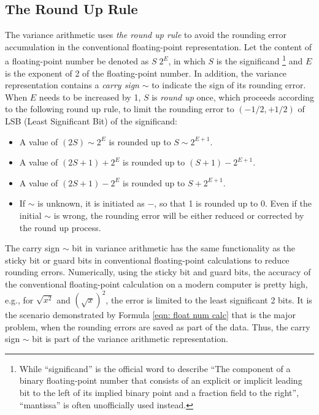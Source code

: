 \documentclass[twoside]{article}
\numberwithin{equation}{section}
\begin{document}
\subsection{The Round Up Rule \cite{Prev_Precision_Arithmetic}}

The variance arithmetic uses \emph{the round up rule} to avoid the rounding error accumulation in the conventional floating-point representation.
Let the content of a floating-point number be denoted as $S\; 2^E$, in which $S$ is the significand \footnote{While ``significand'' is the official word \cite{Floating_Point_Standard} to describe ``The component of a binary floating-point number that consists of an explicit or implicit leading bit to the left of its implied binary point and a fraction field to the right'', ``mantissa'' is often unofficially used instead.} and $E$ is the exponent of 2 of the floating-point number.  
In addition, the variance representation contains a \emph{carry sign} $\sim$  to indicate the sign of its rounding error.
When $E$ needs to be increased by 1, $S$ is \emph{round up} once, which proceeds according to the following round up rule, to limit the rounding error to $(-1/2, +1/2)$ of LSB (Least Significant Bit) of the significand:
\begin{itemize}
\item A value of $(2S) \sim 2^E$ is rounded up to $S \sim 2^{E+1}$.  

\item A value of $(2S+1)\!+\!2^E$ is rounded up to $(S+1)\!-\!2^{E+1}$.
  
\item A value of $(2S+1)\!-\!2^E$ is rounded up to $S\!+\!2^{E+1}$.

\item If $\sim$ is unknown, it is initiated as $-$, so that 1 is rounded up to 0.
Even if the initial $\sim$ is wrong, the rounding error will be either reduced or corrected by the round up process.
\end{itemize}

The carry sign $\sim$ bit in variance arithmetic has the same functionality as the sticky bit or guard bits in conventional floating-point calculations \cite{Floating_Point_Arithmetic} to reduce rounding errors.
Numerically, using the sticky bit and guard bits, the accuracy of the conventional floating-point calculation on a modern computer is pretty high, e.g., for $\sqrt{x^2}$ and $(\sqrt{x})^2$, the error is limited to the least significant 2 bits.
It is the scenario demonstrated by Formula \eqref{eqn: float num calc} that is the major problem, when the rounding errors are saved as part of the data.
Thus, the carry sign $\sim$ bit is part of the variance arithmetic representation.
\end{document}
